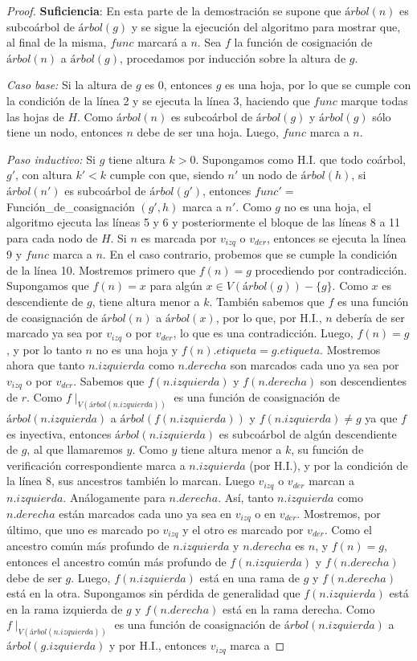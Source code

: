 \begin{proof}
     \textbf{Suficiencia}: En esta parte de la demostración se supone que $árbol(n)$ es subcoárbol de $árbol(g)$ y se sigue la ejecución del algoritmo para mostrar que, al final de la misma, $func$ marcará a $n$. Sea $f$ la función de cosignación de $árbol(n)$ a $árbol(g)$, procedamos por inducción sobre la altura de $g$.

    \emph{Caso base:} Si la altura de $g$ es 0, entonces $g$ es una hoja, por lo que se cumple con la condición de la línea 2 y se ejecuta la línea 3, haciendo que $func$ marque todas las hojas de $H$. Como $árbol(n)$ es subcoárbol de $árbol(g)$ y $árbol(g)$ sólo tiene un nodo, entonces $n$ debe de ser una hoja. Luego, $func$ marca a $n$.

    \emph{Paso inductivo:} Si $g$ tiene altura $k > 0$. Supongamos como H.I. que todo coárbol, $g'$, con altura $k' < k$ cumple con que, siendo $n'$ un nodo de $árbol(h)$, si $árbol(n')$ es subcoárbol de $árbol(g')$, entonces $func'=$Función\_de\_coasignación $(g',h)$ marca a $n'$. Como $g$ no es una hoja, el algoritmo ejecuta las líneas 5 y 6 y posteriormente el bloque de las líneas 8 a 11 para cada nodo de $H$. Si $n$ es marcada por $v_{izq}$ o $v_{der}$, entonces se ejecuta la línea 9 y $func$ marca a $n$. En el caso contrario, probemos que se cumple la condición de la línea 10. Mostremos primero que $f(n) = g$ procediendo por contradicción. Supongamos que $f(n) = x$ para algún $x\in V(árbol(g))-\{g\}$. Como $x$ es descendiente de $g$, tiene altura menor a $k$. También sabemos que $f$ es una función de coasignación de $árbol(n)$ a $árbol(x)$, por lo que, por H.I., $n$ debería de ser marcado ya sea por $v_{izq}$ o por $v_{der}$, lo que es una contradicción. Luego, $f(n) = g$, y por lo tanto $n$ no es una hoja y $f(n).etiqueta = g.etiqueta$. Mostremos ahora que tanto $n.izquierda$ como $n.derecha$ son marcados cada uno ya sea por $v_{izq}$ o por $v_{der}$. Sabemos que $f(n.izquierda)$ y $f(n.derecha)$ son descendientes de $r$. Como $f\mid_{V(árbol(n.izquierda))}$ es una función de coasignación de $árbol(n.izquierda)$ a $árbol(f(n.izquierda))$ y $f(n.izquierda) \neq g$ ya que $f$ es inyectiva, entonces $árbol(n.izquierda)$ es subcoárbol de algún descendiente de $g$, al que llamaremos $y$. Como $y$ tiene altura menor a $k$, su función de verificación correspondiente marca a $n.izquierda$ (por H.I.), y por la condición de la línea 8, sus ancestros también lo marcan. Luego $v_{izq}$ o $v_{der}$ marcan a $n.izquierda$. Análogamente para $n.derecha$. Así, tanto $n.izquierda$ como $n.derecha$ están marcados cada uno ya sea en $v_{izq}$ o en $v_{der}$. Mostremos, por último, que uno es marcado po $v_{izq}$ y el otro es marcado por $v_{der}$. Como el ancestro común más profundo de $n.izquierda$ y $n.derecha$ es $n$, y $f(n)=g$, entonces el ancestro común más profundo de $f(n.izquierda)$ y $f(n.derecha)$ debe de ser $g$. Luego, $f(n.izquierda)$ está en una rama de $g$ y $f(n.derecha)$ está en la otra. Supongamos sin pérdida de generalidad que $f(n.izquierda)$ está en la rama izquierda de $g$ y $f(n.derecha)$ está en la rama derecha. Como $f\mid_{V(árbol(n.izquierda))}$ es una función de coasignación de $árbol(n.izquierda)$ a $árbol(g.izquierda)$ y por H.I., entonces $v_{izq}$ marca a 
\end{proof}
